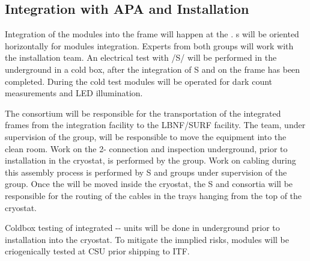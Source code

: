     



\subsection{Integration with APA and Installation}
\label{sec:fdsp-pd-install-pd-apa}

Integration of the  modules into the  frame will happen at the . s will be oriented horizontally for  modules integration. Experts from both groups will work with the installation team.  
An electrical test with /S/ will be performed 
in the underground in a cold box, after the integration of S and  on the  frame has been completed. During the cold test  modules will be operated for dark count measurements and LED illumination.

The  consortium will be responsible for the transportation of the integrated  frames from the integration facility to the LBNF/SURF facility. 
The  team, under supervision of the  group, will be responsible to move the equipment into the clean room. 
Work on the 2- connection and inspection underground, prior to installation in the cryostat, is performed by the  group.
Work on cabling during this assembly process is performed by S and  groups under supervision of the  group.
Once the  will be moved inside the cryostat, the S and  consortia will be responsible for the routing of the cables in the trays hanging from the top of the cryostat. 

Coldbox testing of integrated  -- units will be done in underground prior to installation into the cryostat. To mitigate the imnplied risks,  modules will be criogenically tested at CSU prior shipping to ITF.

